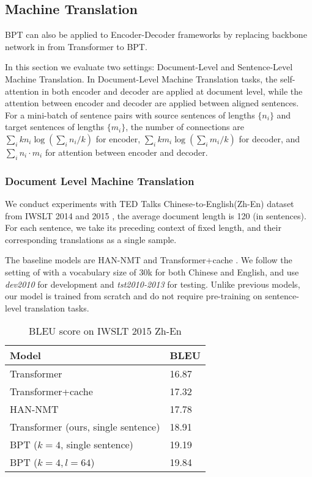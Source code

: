\documentclass[11pt,a4paper]{article}
\begin{document}
\subsection{Machine Translation}

BPT can also be applied to Encoder-Decoder frameworks by replacing backbone network in \citet{vaswani2017attention} from Transformer to BPT.

In this section we evaluate two settings: Document-Level and Sentence-Level Machine Translation. In Document-Level Machine Translation tasks, the self-attention in both encoder and decoder are applied at document level, while the attention between encoder and decoder are applied between aligned sentences. For a mini-batch of sentence pairs with source sentences of lengths $\{n_i\}$ and target sentences of lengths $\{m_i\}$, the number of connections are $\sum_{i} k n_i \log (\sum_{i} n_i / k)$ for encoder, $\sum_{i}k m_i \log (\sum_{i} m_i / k) $ for decoder, and $\sum_{i} n_i\cdot m_i$ for attention between encoder and decoder.

\subsubsection{Document Level Machine Translation}

We conduct experiments with TED Talks Chinese-to-English(Zh-En) dataset from IWSLT 2014 and 2015 \citep{cettolo2012wit3, cettolo2016iwslt}, the average document length is 120 (in sentences). For each sentence, we take its preceding context of fixed length, and their corresponding translations as a single sample.

The baseline models are HAN-NMT \cite{miculicich-etal-2018-document} and  Transformer+cache \cite{tu2018learning}. We follow the setting of \citet{miculicich-etal-2018-document} with a vocabulary size of 30k for both Chinese and English, and use \textit{dev2010} for development and \textit{tst2010-2013} for testing. Unlike previous models, our model is trained from scratch and do not require pre-training on sentence-level translation tasks.

\begin{table}[!htb]
\small
\centering
\begin{tabular}{ll}
\toprule
Model                         & BLEU  \\
\midrule
Transformer \cite{vaswani2017attention} & 16.87 \\
Transformer+cache \cite{tu2018learning} & 17.32 \\
HAN-NMT \cite{miculicich-etal-2018-document} & 17.78 \\
\midrule
Transformer (ours, single sentence) & 18.91 \\
BPT ($k=4$, single sentence) & 19.19 \\
BPT ($k=4, l=64$) & 19.84 \\
\bottomrule
\end{tabular}
\caption{BLEU score on IWSLT 2015 Zh-En}
\label{tbl:doc-mt}
\end{table}
\end{document}
